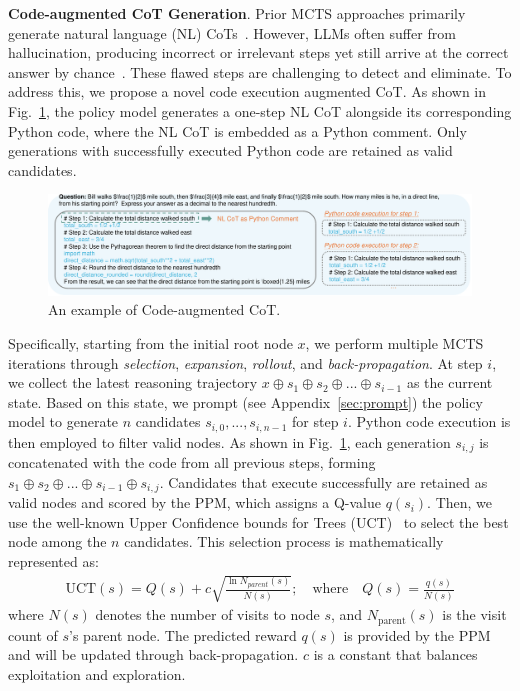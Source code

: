 \noindent\textbf{Code-augmented CoT Generation}. Prior MCTS approaches primarily  generate natural language (NL)  CoTs~\citep{rstar,restmcts}. However, LLMs often suffer from hallucination, producing incorrect or irrelevant  steps yet still arrive at the correct answer by chance~\citep{lanham2023measuring}. These flawed steps are challenging to detect and eliminate. To address this, we propose a novel code execution augmented CoT. As shown in Fig.~\ref{fig:promptexample},  the policy model generates a one-step NL CoT alongside its corresponding Python code, where the NL CoT is embedded as a Python comment.  Only generations with successfully executed Python code  are retained as valid candidates. 
\begin{figure}[ht]
	\centering
	\includegraphics[width=1\textwidth]{promptexample.pdf}	
	\vspace{-4ex}
	\caption{An example of Code-augmented CoT.}	\vspace{-2ex}
	\label{fig:promptexample}
\end{figure}

Specifically,  starting from the initial root node $x$, we perform multiple MCTS iterations through \textit{selection}, \textit{expansion},  \textit{rollout}, and \textit{back-propagation}. At step $i$, we collect the latest reasoning trajectory $x\oplus s_1\oplus s_2\oplus ...\oplus s_{i-1}$ as the current state. Based on this state, we prompt (see Appendix~\ref{sec:prompt}) the policy model to generate $n$ candidates $s_{i,0}, ..., s_{i, n-1}$ for step $i$. Python code execution is then employed to filter valid nodes. As shown in Fig.~\ref{fig:promptexample}, each generation $s_{i,j}$ is  concatenated with the code from all previous steps, forming $s_1\oplus s_2\oplus ...\oplus s_{i-1}\oplus s_{i,j}$. Candidates that execute successfully are retained as valid nodes and scored by the PPM, which assigns a Q-value $q(s_{i})$. 
Then, we use the well-known Upper Confidence bounds for Trees (UCT)~\citep{utc} to select the best node among the $n$ candidates. This selection process is mathematically represented as: 
\begin{gather}
	\label{eq:uct}
	\text{UCT}(s) =Q(s)+ c \sqrt{\frac{\ln N_{parent}(s)}{N(s)}}; \quad \text{where} \quad Q(s)=\frac{q (s)}{N(s)} 
\end{gather}
where $N(s)$ denotes the number of visits to node $s$, and $N_{\text{parent}}(s)$ is the visit count of $s$'s parent node. The predicted reward $q(s)$ is provided by the PPM and will be updated through back-propagation.  $c$ is a constant that balances exploitation and exploration. 



